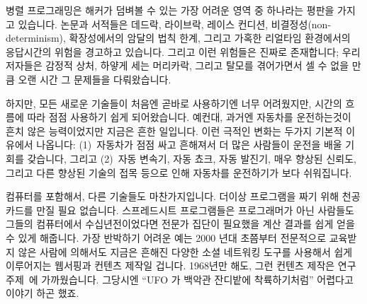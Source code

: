 
%

병렬 프로그래밍은 해커가 덤벼볼 수 있는 가장 어려운 영역 중 하나라는 평판을
가지고 있습니다.
논문과 서적들은 데드락, 라이브락, 레이스 컨디션, 비결정성(non-determinism),
확장성에서의 암달의 법칙 한계, 그리고 가혹한 리얼타임 환경에서의 응답시간의
위험을 경고하고 있습니다.
그리고 이런 위험들은 진짜로 존재합니다; 우리 저자들은 감정적 상처, 하얗게 세는
머리카락, 그리고 탈모를 겪어가면서 셀 수 없을 만큼 오랜 시간 그 문제들을
다뤄왔습니다.

하지만, 모든 새로운 기술들이 처음엔 곧바로 사용하기엔 너무 어려웠지만, 시간의
흐름에 따라 점점 사용하기 쉽게 되어왔습니다.
예컨대, 과거엔 자동차를 운전하는것이 흔치 않은
능력이었지만 지금은 흔한 일입니다.
이런 극적인 변화는 두가지 기본적 이유에서 나옵니다: (1)~자동차가 점점 싸고
흔해져서 더 많은 사람들이 운전을 배울 기회를 갖습니다, 그리고 (2)~자동 변속기,
자동 쵸크, 자동 발진기, 매우 향상된 신뢰도, 그리고 다른 향상된 기술의 접목
등으로 인해 자동차를 운전하기가 보다 쉬워집니다.

컴퓨터를 포함해서, 다른 기술들도 마찬가지입니다.
더이상 프로그램을 짜기 위해 천공카드를 만질 필요 없습니다.
스프레드시트 프로그램들은 프로그래머가 아닌 사람들도 그들의 컴퓨터에서
수십년전이었다면 전문가 집단이 필요했을 계산 결과를 쉽게 얻을 수 있게 해줍니다.
가장 반박하기 어려운 예는 2000 년대 초쯤부터 전문적으로 교육받지 않은 사람에
의해서도 지금은 흔해진 다양한 소셜 네트워킹 도구를 사용해서 쉽게 이루어지는
웹서핑과 컨텐츠 제작일 겁니다.
1968년만 해도, 그런 컨텐츠 제작은 연구 주제~\cite{DouglasEngelbart1968}에
가까웠습니다.
그당시엔 ``UFO 가 백악관 잔디밭에 착륙하기처럼''\cite{ScottGriffen2000}
어렵다고 이야기 하곤 했죠.
\iffalse

